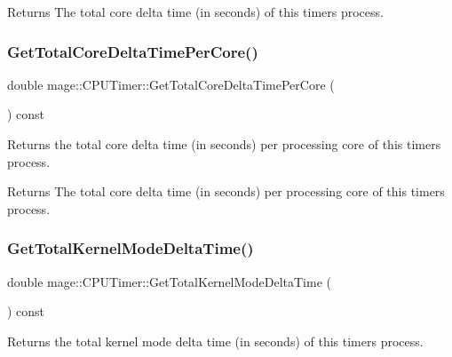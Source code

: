 \begin{DoxyReturn}{Returns}
The total core delta time (in seconds) of this timer\textquotesingle{}s process. 
\end{DoxyReturn}
\hypertarget{classmage_1_1_c_p_u_timer_af501e54e834f68469dd4a0f128f2da79}{}\label{classmage_1_1_c_p_u_timer_af501e54e834f68469dd4a0f128f2da79} 
\subsubsection{\texorpdfstring{Get\+Total\+Core\+Delta\+Time\+Per\+Core()}{GetTotalCoreDeltaTimePerCore()}}
{\footnotesize\ttfamily double mage\+::\+C\+P\+U\+Timer\+::\+Get\+Total\+Core\+Delta\+Time\+Per\+Core (\begin{DoxyParamCaption}{ }\end{DoxyParamCaption}) const}

Returns the total core delta time (in seconds) per processing core of this timer\textquotesingle{}s process.

\begin{DoxyReturn}{Returns}
The total core delta time (in seconds) per processing core of this timer\textquotesingle{}s process. 
\end{DoxyReturn}
\hypertarget{classmage_1_1_c_p_u_timer_aa9a1db98ad3d46674c733256dedff164}{}\label{classmage_1_1_c_p_u_timer_aa9a1db98ad3d46674c733256dedff164} 
\subsubsection{\texorpdfstring{Get\+Total\+Kernel\+Mode\+Delta\+Time()}{GetTotalKernelModeDeltaTime()}}
{\footnotesize\ttfamily double mage\+::\+C\+P\+U\+Timer\+::\+Get\+Total\+Kernel\+Mode\+Delta\+Time (\begin{DoxyParamCaption}{ }\end{DoxyParamCaption}) const}

Returns the total kernel mode delta time (in seconds) of this timer\textquotesingle{}s process.

